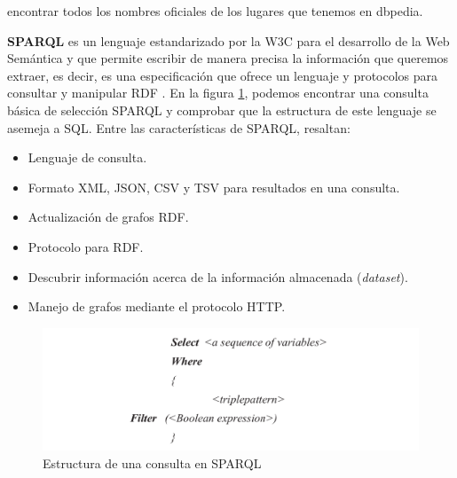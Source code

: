 encontrar todos los nombres oficiales de los lugares que tenemos en dbpedia.

\textbf{SPARQL} es un lenguaje estandarizado por la W3C para el desarrollo de la Web Semántica y que permite escribir de manera precisa la información que queremos extraer, es decir, es una especificación que ofrece un lenguaje y protocolos para consultar y manipular RDF \cite{tesis-otro}. En la figura \ref{fig:sparql}, podemos encontrar una consulta básica de selección SPARQL y comprobar que la estructura de este lenguaje se asemeja a SQL. Entre las características de SPARQL, resaltan: 

\begin{itemize}
	\item Lenguaje de consulta.
	\item Formato XML, JSON, CSV y TSV  para resultados en una consulta.
	\item Actualización de grafos RDF.
	\item Protocolo para RDF.
	\item Descubrir información acerca de la información  almacenada (\textit{dataset}).
	\item Manejo de grafos mediante el protocolo HTTP.
\end{itemize}


\begin{figure}[H]
	\centering
	\includegraphics[width=1.1\linewidth]{imagenes/capitulo3/sparql}
	\caption{Estructura de una consulta en SPARQL}
	\label{fig:sparql}
\end{figure}

